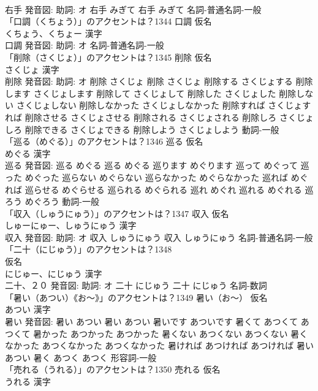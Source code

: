 \documentclass[8pt]{extreport}
\begin{document}
\begin{CJK}{UTF8}{min}
\\	右手 発音図: 助詞: オ	右手 みぎて		右手 みぎて				名詞-普通名詞-一般 
\\	「口調（くちょう）」のアクセントは？1344	口調 仮名　
\\	くちょう、くちょー 漢字　
\\	口調 発音図: 助詞: オ							名詞-普通名詞-一般 
\\	「削除（さくじょ）」のアクセントは？1345	削除 仮名　
\\	さくじょ 漢字　
\\	削除 発音図: 助詞: オ	削除 さくじょ		削除 さくじょ 削除する さくじょする 削除します さくじょします 削除して さくじょして 削除した さくじょした 削除しない さくじょしない 削除しなかった さくじょしなかった 削除すれば さくじょすれば 削除させる さくじょさせる 削除される さくじょされる 削除しろ さくじょしろ 削除できる さくじょできる 削除しよう さくじょしよう				動詞-一般 
\\	「巡る（めぐる）」のアクセントは？1346	巡る 仮名　
\\	めぐる 漢字　
\\	巡る 発音図:	巡る めぐる		巡る めぐる 巡ります めぐります 巡って めぐって 巡った めぐった 巡らない めぐらない 巡らなかった めぐらなかった 巡れば めぐれば 巡らせる めぐらせる 巡られる めぐられる 巡れ めぐれ 巡れる めぐれる 巡ろう めぐろう				動詞-一般 
\\	「収入（しゅうにゅう）」のアクセントは？1347	収入 仮名　
\\	しゅーにゅー、しゅうにゅう 漢字　
\\	収入 発音図: 助詞: オ	収入 しゅうにゅう		収入 しゅうにゅう				名詞-普通名詞-一般 
\\	「二十（にじゅう）」のアクセントは？1348	
\\	仮名　
\\	にじゅー、にじゅう 漢字　
\\	二十、２０ 発音図: 助詞: オ	二十 にじゅう		二十 にじゅう				名詞-数詞 
\\	「暑い（あつい）《お〜》」のアクセントは？1349	暑い（お〜） 仮名　
\\	あつい 漢字　
\\	暑い 発音図:	暑い あつい		暑い あつい 暑いです あついです 暑くて あつくて あつくて 暑かった あつかった あつかった 暑くない あつくない あつくない 暑くなかった あつくなかった あつくなかった 暑ければ あつければ あつければ 暑い あつい 暑く あつく あつく				形容詞-一般 
\\	「売れる（うれる）」のアクセントは？1350	売れる 仮名　
\\	うれる 漢字　

\end{CJK}
\end{document}
